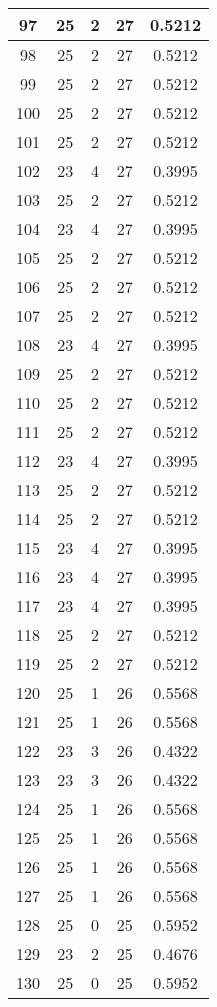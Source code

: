 \documentclass[letterpaper, 12pt]{article}
\begin{document}
\begin{longtable}{|c|c|c|c|c|}
\hline
97 & 25 & 2 & 27 & 0.5212 \\
\hline
98 & 25 & 2 & 27 & 0.5212 \\
\hline
99 & 25 & 2 & 27 & 0.5212 \\
\hline
100 & 25 & 2 & 27 & 0.5212 \\
\hline
101 & 25 & 2 & 27 & 0.5212 \\
\hline
102 & 23 & 4 & 27 & 0.3995 \\
\hline
103 & 25 & 2 & 27 & 0.5212 \\
\hline
104 & 23 & 4 & 27 & 0.3995 \\
\hline
105 & 25 & 2 & 27 & 0.5212 \\
\hline
106 & 25 & 2 & 27 & 0.5212 \\
\hline
107 & 25 & 2 & 27 & 0.5212 \\
\hline
108 & 23 & 4 & 27 & 0.3995 \\
\hline
109 & 25 & 2 & 27 & 0.5212 \\
\hline
110 & 25 & 2 & 27 & 0.5212 \\
\hline
111 & 25 & 2 & 27 & 0.5212 \\
\hline
112 & 23 & 4 & 27 & 0.3995 \\
\hline
113 & 25 & 2 & 27 & 0.5212 \\
\hline
114 & 25 & 2 & 27 & 0.5212 \\
\hline
115 & 23 & 4 & 27 & 0.3995 \\
\hline
116 & 23 & 4 & 27 & 0.3995 \\
\hline
117 & 23 & 4 & 27 & 0.3995 \\
\hline
118 & 25 & 2 & 27 & 0.5212 \\
\hline
119 & 25 & 2 & 27 & 0.5212 \\
\hline
120 & 25 & 1 & 26 & 0.5568 \\
\hline
121 & 25 & 1 & 26 & 0.5568 \\
\hline
122 & 23 & 3 & 26 & 0.4322 \\
\hline
123 & 23 & 3 & 26 & 0.4322 \\
\hline
124 & 25 & 1 & 26 & 0.5568 \\
\hline
125 & 25 & 1 & 26 & 0.5568 \\
\hline
126 & 25 & 1 & 26 & 0.5568 \\
\hline
127 & 25 & 1 & 26 & 0.5568 \\
\hline
128 & 25 & 0 & 25 & 0.5952 \\
\hline
129 & 23 & 2 & 25 & 0.4676 \\
\hline
130 & 25 & 0 & 25 & 0.5952 \\

\end{longtable}
\end{document}
